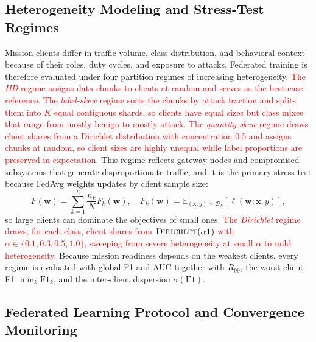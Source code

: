 \documentclass[conference]{IEEEtran}
\begin{document}
\subsection{Heterogeneity Modeling and Stress-Test Regimes}
\label{subsec:heterogeneity_modeling}

Mission clients differ in traffic volume, class distribution, and
behavioral context because of their roles, duty cycles, and exposure
to attacks. Federated training is therefore evaluated under four
partition regimes of increasing heterogeneity.
\textcolor{red}{The \textit{IID} regime assigns data chunks
to clients at random and serves as the best-case reference. The
\textit{label-skew} regime sorts the chunks by attack fraction and
splits them into $K$ equal contiguous shards, so clients have equal
sizes but class mixes that range from mostly benign to mostly attack.
The \textit{quantity-skew} regime draws client shares from a
Dirichlet distribution with concentration 0.5 and assigns chunks at
random, so client sizes are highly unequal while label proportions
are preserved in expectation.} This regime reflects gateway nodes and
compromised subsystems that generate disproportionate traffic, and it
is the primary stress test because FedAvg weights updates by client
sample size:
\begin{equation}
F(\mathbf{w})=\sum_{k=1}^{K}\frac{n_k}{N}F_k(\mathbf{w}),\quad
F_k(\mathbf{w})=\mathbb{E}_{(\mathbf{x},y)\sim\mathcal{D}_k}
[\ell(\mathbf{w};\mathbf{x},y)],
\label{eq:fedavg_weighted_obj}
\end{equation}
so large clients can dominate the objectives of small ones.
\textcolor{red}{The \textit{Dirichlet} regime draws, for
each class, client shares from $\textsc{Dirichlet}(\alpha\mathbf{1})$
with $\alpha\in\{0.1,0.3,0.5,1.0\}$, sweeping from severe heterogeneity
at small $\alpha$ to mild heterogeneity.} Because mission readiness
depends on the weakest clients, every regime is evaluated with global
F1 and AUC together with $R_{99}$, the worst-client F1
$\min_k\mathrm{F1}_k$, and the inter-client dispersion
$\sigma(\mathrm{F1})$.

\subsection{Federated Learning Protocol and Convergence
            Monitoring}
\label{subsec:federated_protocol_convergence}
\end{document}
